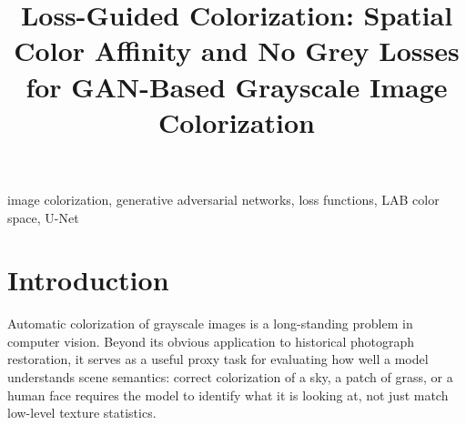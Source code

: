 \documentclass[conference]{IEEEtran}
\begin{document}

\title{Loss-Guided Colorization: Spatial Color Affinity and No Grey Losses
       for GAN-Based Grayscale Image Colorization}

\author{%
}

\maketitle


\begin{abstract}
%
\end{abstract}

\begin{IEEEkeywords}
image colorization, generative adversarial networks, loss functions,
LAB color space, U-Net
\end{IEEEkeywords}


\section{Introduction}

Automatic colorization of grayscale images is a long-standing problem in computer
vision. Beyond its obvious application to historical photograph restoration, it
serves as a useful proxy task for evaluating how well a model understands scene
semantics: correct colorization of a sky, a patch of grass, or a human face
requires the model to identify what it is looking at, not just match low-level
texture statistics.
\end{document}
